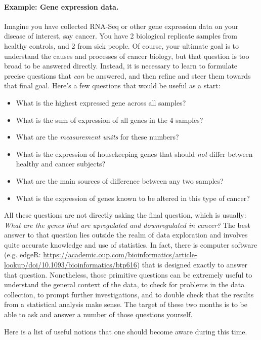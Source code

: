 \documentclass[12pt,a4paper,notitlepage,onecolumn]{article}
\begin{document}
\paragraph{Example: Gene expression data.} Imagine you have collected RNA-Seq or other gene expression data on your disease of interest, say cancer. You have 2 biological replicate samples from healthy controls, and 2 from sick people. Of course, your ultimate goal is to understand the causes and processes of cancer biology, but that question is too broad to be answered directly. Instead, it is necessary to learn to formulate precise questions that \textit{can} be answered, and then refine and steer them towards that final goal. Here's a few questions that would be useful as a start:

\begin{itemize}
\item What is the highest expressed gene across all samples?
\item What is the sum of expression of all genes in the 4 samples?
\item What are the \textit{measurement units} for these numbers?
\item What is the expression of housekeeping genes that should \textit{not} differ between healthy and cancer subjects?
\item What are the main sources of difference between any two samples?
\item What is the expression of genes known to be altered in this type of cancer?
\end{itemize}

All these questions are not directly asking the final question, which is usually: \textit{What are the genes that are upregulated and downregulated in cancer?} The best answer to that question lies outside the realm of data exploration and involves quite accurate knowledge and use of statistics. In fact, there is computer software (e.g. edgeR: \url{https://academic.oup.com/bioinformatics/article-lookup/doi/10.1093/bioinformatics/btp616}) that is designed exactly to answer that question. Nonetheless, those primitive questions can be extremely useful to understand the general context of the data, to check for problems in the data collection, to prompt further investigations, and to double check that the results from a statistical analysis make sense. The target of these two months is to be able to ask and answer a number of those questions yourself.

Here is a list of useful notions that one should become aware during this time.
\end{document}
